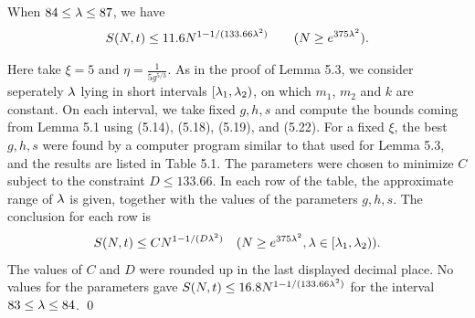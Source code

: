   When $84 \le \lambda\le 87$, we have
$$
S(N,t) \le 11.6 N^{1-1/(133.66\lambda^2)} \qquad (N \ge e^{375\lambda^2}).
$$
\endproclaim

  Here take $\xi=5$ and $\eta=\frac{1}{5g^{5/3}}$.
As in the proof of Lemma 5.3, we consider seperately $\lambda$ lying in
short intervals $[\lambda_1,\lambda_2)$, on which $m_1$, $m_2$ and $k$ are
constant.  On each interval, we take fixed $g,h,s$
and compute the bounds coming from Lemma 5.1 using (5.14), (5.18),
(5.19), and (5.22).  For a fixed $\xi$, the best $g,h,s$
were found by a computer program similar to that used for Lemma 5.3,
 and the results are listed in Table 5.1.
The parameters were chosen to minimize $C$ subject to the constraint
$D \le 133.66$.
In each row of the table, the approximate range of $\lambda$ is given,
together with the values of the parameters $g,h,s$.  The conclusion
for each row is
$$
S(N,t) \le C N^{1-1/(D \lambda^2)} \quad (N\ge e^{375\lambda^2}, \lambda\in [\lambda_1,
\lambda_2)).
$$
The values of $C$ and $D$ were rounded up in the last displayed decimal
place.  No values for the parameters gave $S(N,t) \le 16.8 N^{1-1/(133.66
\lambda^2)}$ for the interval $83\le \lambda \le 84$.
\qed\enddemo


